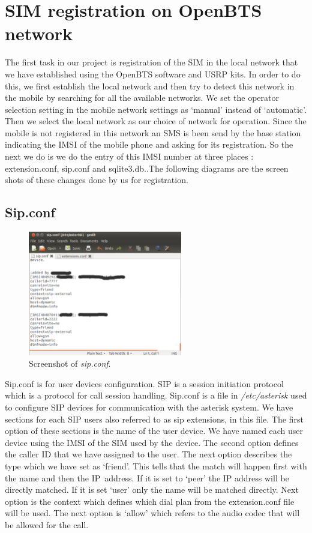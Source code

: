 \chapter{SIM registration on OpenBTS network}

The first task in our project is registration of the SIM in the local network
that we have established using the OpenBTS software and USRP kits. In order to
do this, we first establish the local network and then try to detect this
network in the mobile by searching for all the available networks. We set the
operator selection setting in the mobile network settings as ‘manual’ instead
of ‘automatic’. Then we select the local network as our choice of network for
operation. Since the mobile is not registered in this network an SMS is been
send by the base station indicating the IMSI of the mobile phone and asking
for its registration. So the next we do is we do the entry of this IMSI number
at three places : extension.conf, sip.conf and sqlite3.db..The following
diagrams are the screen shots of these changes done by us for registration. 

\section{Sip.conf}

\begin{figure}
  \centering
    \includegraphics[width=0.6\textwidth]{../images/sip_conf}
  \caption[sip.conf]{Screenshot of \emph{sip.conf}.}
  \label{sip_conf}
\end{figure}

Sip.conf is for user devices configuration. SIP is a session initiation
protocol which is a protocol for call session handling. Sip.conf is a file in
\emph{/etc/asterisk} used to configure SIP devices for communication with the
asterisk system. We have sections for each SIP users also referred to as sip
extensions, in this file. The first option of these sections is the name of
the user device. We have named each user device using the IMSI of the SIM used
by the device. The second option defines the caller ID that we have assigned
to the user. The next option describes the type which we have set as ‘friend’.
This tells that the match will happen first with the name and then the
IP~address. If it is set to ‘peer’ the IP address will be directly matched.
If it is set ‘user’ only the name will be matched directly. Next option is the
context which defines which dial plan from the extension.conf file will be
used. The next option is ‘allow’ which refers to the audio codec that will be
allowed for the call. 

